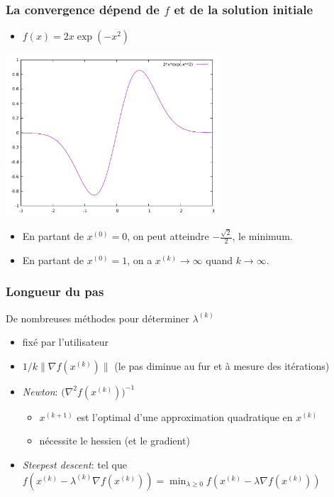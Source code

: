 \documentclass{beamer}
\begin{document}
\begin{frame}
  \frametitle{La convergence dépend de $f$ et de la solution initiale}

  \begin{itemize}
    \item $f(x) = 2x\exp{(-x^2)}$
  \end{itemize}
  
  \begin{center}
      \includegraphics[width=0.6\textwidth]{desc-grad-non-conv}    
  \end{center}
  
  \begin{itemize}
  \item En partant de $x^{(0)} = 0$, on peut atteindre $-\frac{\sqrt{2}}{2}$, le minimum.
  \item En partant de $x^{(0)} = 1$, on a $x^{(k)} \rightarrow \infty$ quand $k \rightarrow \infty$. 
  \end{itemize}
  
\end{frame}


\begin{frame}
  \frametitle{Longueur du pas}

  \begin{block}{De nombreuses méthodes pour déterminer $\lambda^{(k)}$}
  \begin{itemize}
  \item fixé par l'utilisateur %
  \item $1 / k \|{\nabla f}(x^{(k)})\|$ (le pas diminue au fur et à mesure des itérations)
  \item \emph{Newton}: $\Big( {\nabla^2 f}(x^{(k)}) \Big)^{-1}$
    \begin{itemize}
    \item $x^{(k+1)}$ est l'optimal d'une approximation quadratique en $x^{(k)}$
    \item nécessite le hessien (et le gradient)
    \end{itemize}
  \item \emph{Steepest descent}: tel que $f(x^{(k)} - \lambda^{(k)} {\nabla f}(x^{(k)}))
    = \min_{\lambda \geq 0} f(x^{(k)} - \lambda {\nabla f}(x^{(k)}))$
  \end{itemize}
  \end{block}
\end{frame}
\end{document}
